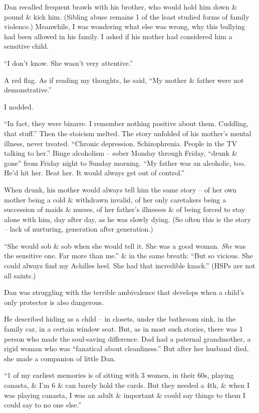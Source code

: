 \documentclass{article}
\numberwithin{equation}{section}
\begin{document}
Dan recalled frequent brawls with his brother, who would hold him down \& pound \& kick him. (Sibling abuse remains 1 of the least studied forms of family violence.) Meanwhile, I was wondering what else was wrong, why this bullying had been allowed in his family. I asked if his mother had considered him a sensitive child.

``I don't know. She wasn't very attentive.''

A red flag. As if reading my thoughts, he said, ``My mother \& father were not demonstrative.''

I nodded.

``In fact, they were bizarre. I remember nothing positive about them. Cuddling, that stuff.'' Then the stoicism melted. The story unfolded of his mother's mental illness, never treated. ``Chronic depression. Schizophrenia. People in the TV talking to her.'' Binge alcoholism -- sober Monday through Friday, ``drunk \& gone'' from Friday night to Sunday morning. ``My father was an alcoholic, too. He'd hit her. Beat her. It would always get out of control.''

When drunk, his mother would always tell him the same story -- of her own mother being a cold \&  withdrawn invalid, of her only caretakers being a succession of maids \& nurses, of her father's illnesses \& of being forced to stay alone with him, day after day, as he was slowly dying. (So often this is the story -- lack of nurturing, generation after generation.)

``She would sob \& sob when she would tell it. She was a good woman. \textit{She} was the sensitive one. Far more than me.'' \& in the same breath: ``But so vicious. She could always find my Achilles heel. She had that incredible knack.'' (HSPs are not all saints.)

Dan was struggling with the terrible ambivalence that develops when a child's only protector is also dangerous.

He described hiding as a child -- in closets, under the bathroom sink, in the family car, in a certain window seat. But, as in most such stories, there was 1 person who made the soul-saving difference. Dad had a paternal grandmother, a rigid woman who was ``fanatical about cleanliness.'' But after her husband died, she made a companion of little Dan.

``1 of my earliest memories is of sitting with 3 women, in their 60s, playing canasta, \& I'm 6 \& can barely hold the cards. But they needed a 4th, \& when I was playing canasta, I was an adult \& important \& could say things to them I could say to no one else.''
\end{document}
